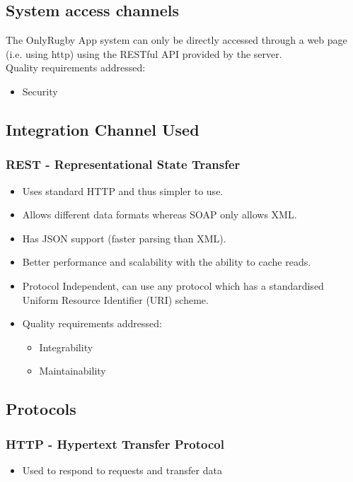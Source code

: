 \documentclass[hidelinks,a4paper,12pt]{article}
\begin{document}
	\subsection{System access channels}
	The OnlyRugby App system can only be directly accessed through a web page (i.e. using http) using the RESTful API provided by the server. \\
	Quality requirements addressed:
	\begin{itemize}
		\item Security
	\end{itemize}

	\subsection{Integration Channel Used}
	\subsubsection {REST - Representational State Transfer}
	\begin{itemize}
		\item Uses standard HTTP and thus simpler to use.
		\item Allows different data formats whereas SOAP only allows XML.
		\item Has JSON support (faster parsing than XML).
		\item Better performance and scalability with the ability to cache reads.
		\item Protocol Independent, can use any protocol which has a standardised Uniform Resource Identifier (URI) scheme.
		\item Quality requirements addressed:
			\begin{itemize}
				\item Integrability
				\item Maintainability
			\end{itemize}
	\end{itemize}

	\subsection{Protocols}
	\subsubsection {HTTP - Hypertext Transfer Protocol}
	\begin{itemize}
		\item Used to respond to requests and transfer data
	\end{itemize}
\end{document}
